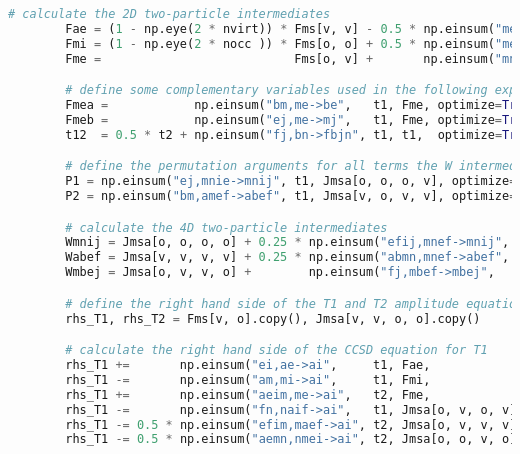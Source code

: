 \begin{lstlisting}[language=Python, caption={\acrshort{ccd} and \acrshort{ccsd} method exercise code solution.}, label=code:cc_solution]
        # calculate the 2D two-particle intermediates
        Fae = (1 - np.eye(2 * nvirt)) * Fms[v, v] - 0.5 * np.einsum("me,am->ae",     Fms[o, v],        t1,   optimize=True)                                                   +       np.einsum("mafe,fm->ae",   Jmsa[o, v, v, v], t1,   optimize=True)                                                   - 0.5 * np.einsum("mnef,afmn->ae", Jmsa[o, o, v, v], ttau, optimize=True)
        Fmi = (1 - np.eye(2 * nocc )) * Fms[o, o] + 0.5 * np.einsum("me,ei->mi",     Fms[o, v],        t1,   optimize=True)                                                   +       np.einsum("mnie,en->mi",   Jmsa[o, o, o, v], t1,   optimize=True)                                                   + 0.5 * np.einsum("mnef,efin->mi", Jmsa[o, o, v, v], ttau, optimize=True)
        Fme =                           Fms[o, v] +       np.einsum("mnef,fn->me",   Jmsa[o, o, v, v], t1,   optimize=True)

        # define some complementary variables used in the following expressions
        Fmea =            np.einsum("bm,me->be",   t1, Fme, optimize=True)
        Fmeb =            np.einsum("ej,me->mj",   t1, Fme, optimize=True)
        t12  = 0.5 * t2 + np.einsum("fj,bn->fbjn", t1, t1,  optimize=True)

        # define the permutation arguments for all terms the W intermediates
        P1 = np.einsum("ej,mnie->mnij", t1, Jmsa[o, o, o, v], optimize=True)
        P2 = np.einsum("bm,amef->abef", t1, Jmsa[v, o, v, v], optimize=True)

        # calculate the 4D two-particle intermediates
        Wmnij = Jmsa[o, o, o, o] + 0.25 * np.einsum("efij,mnef->mnij", tau, Jmsa[o, o, v, v], optimize=True) + P1 - P1.swapaxes(2, 3)
        Wabef = Jmsa[v, v, v, v] + 0.25 * np.einsum("abmn,mnef->abef", tau, Jmsa[o, o, v, v], optimize=True) - P2 + P2.swapaxes(0, 1)
        Wmbej = Jmsa[o, v, v, o] +        np.einsum("fj,mbef->mbej",   t1,  Jmsa[o, v, v, v], optimize=True)                                  -        np.einsum("bn,mnej->mbej",   t1,  Jmsa[o, o, v, o], optimize=True)                                  -        np.einsum("fbjn,mnef->mbej", t12, Jmsa[o, o, v, v], optimize=True)

        # define the right hand side of the T1 and T2 amplitude equations
        rhs_T1, rhs_T2 = Fms[v, o].copy(), Jmsa[v, v, o, o].copy()

        # calculate the right hand side of the CCSD equation for T1
        rhs_T1 +=       np.einsum("ei,ae->ai",     t1, Fae,              optimize=True)
        rhs_T1 -=       np.einsum("am,mi->ai",     t1, Fmi,              optimize=True)
        rhs_T1 +=       np.einsum("aeim,me->ai",   t2, Fme,              optimize=True)
        rhs_T1 -=       np.einsum("fn,naif->ai",   t1, Jmsa[o, v, o, v], optimize=True)
        rhs_T1 -= 0.5 * np.einsum("efim,maef->ai", t2, Jmsa[o, v, v, v], optimize=True)
        rhs_T1 -= 0.5 * np.einsum("aemn,nmei->ai", t2, Jmsa[o, o, v, o], optimize=True)


\end{lstlisting}
